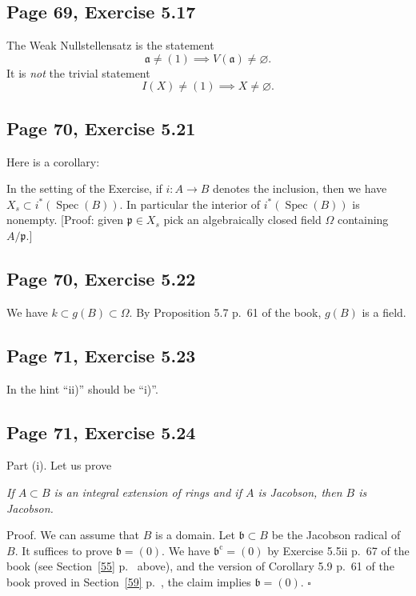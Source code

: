 \documentclass[parskip=half,fontsize=12pt]{scrartcl}%
\newcommand{\oo}{\operatorname}\newcommand{\ooo}{\operatorname*}
\newcommand{\mf}{\mathfrak}
\newcommand{\aaa}{\mf a}
\newcommand{\bbb}{\mf b}
\newcommand{\mmm}{\mf m}
\newcommand{\nnn}{\mf n}
\newcommand{\ppp}{\mf p}
\newcommand{\Spec}{\operatorname{Spec}}\newcommand{\Sp}{\operatorname{Spec}}
\begin{document}
\subsection{Page 69, Exercise 5.17}%

The Weak Nullstellensatz is the statement
$$
\aaa\ne(1)\implies V(\aaa)\ne\varnothing.
$$ 
It is \emph{not} the trivial statement 
$$
I(X)\ne(1)\implies X\ne\varnothing.
$$ 

\subsection{Page 70, Exercise 5.21}\label{522}%

Here is a corollary:

In the setting of the Exercise, if $i:A\to B$ denotes the inclusion, then we have $X_s\subset i^*(\Spec(B))$. In particular the interior of $i^*(\Spec(B))$ is nonempty. [Proof: given $\ppp\in X_s$ pick an algebraically closed field $\Omega$ containing $A/\ppp$.]

\subsection{Page 70, Exercise 5.22}%

We have $k\subset g(B)\subset\Omega$. By Proposition 5.7 p.~61 of the book, $g(B)$ is a field.

\subsection{Page 71, Exercise 5.23}%

In the hint ``ii)'' should be ``i)''.

\subsection{Page 71, Exercise 5.24}%
 
Part (i). Let us prove %

\emph{If $A\subset B$ is an integral extension of rings and if $A$ is Jacobson, then $B$ is Jacobson.}

Proof. %
We can assume that $B$ is a domain. Let $\bbb\subset B$ be the Jacobson radical of $B$. It suffices to prove $\bbb=(0)$. We have %
$\bbb^{\oo c}=(0)$ by Exercise 5.5ii p.~67 of the book (see Section~\ref{55} p.~\pageref{55} above), and %
the version of Corollary 5.9 p.~61 of the book proved in Section~\ref{59} p.~\pageref{59}, the claim implies $\bbb=(0)$. $\square$
\end{document}
